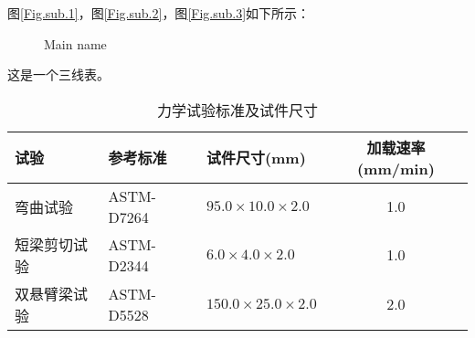 图\ref{Fig.sub.1}，图\ref{Fig.sub.2}，图\ref{Fig.sub.3}如下所示：
\begin{figure}[H]
\centering  %
\caption{Main name}
\label{Fig.main2}
\end{figure}

这是一个三线表。
\begin{table}[hbt!]
    \small
    \caption{\label{Tab5:table_aging_ASTM} 力学试验标准及试件尺寸}
    \centering
    \begin{tabularx}{\textwidth}{XXX c}
    \toprule
    试验 & 参考标准 & 试件尺寸(mm) & 加载速率(mm/min) \\
    \midrule
    弯曲试验     & ASTM-D7264 & $\text{95.0}\times \text{10.0}\times \text{2.0}$ & 1.0\\
    短梁剪切试验  & ASTM-D2344 & $\text{6.0}\times \text{4.0}\times \text{2.0}$ & 1.0\\
    双悬臂梁试验  & ASTM-D5528 & $\text{150.0}\times \text{25.0}\times \text{2.0}$ & 2.0\\
    \bottomrule
    \end{tabularx}
\end{table}

\begingroup
  
  \xiaosi\song
  \setlength{\bibsep}{5pt}
  
\endgroup


